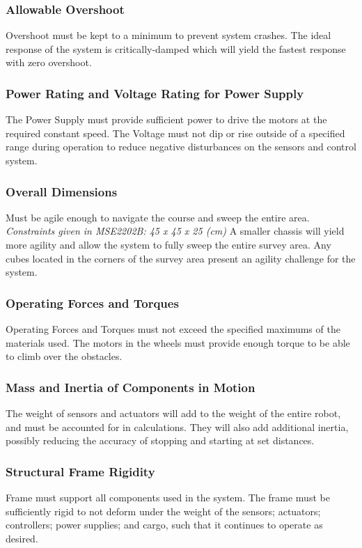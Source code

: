 \documentclass[12pt]{article}
\begin{document}
\subsubsection{Allowable Overshoot}
Overshoot must be kept to a minimum to prevent system crashes. The ideal response of the system is critically-damped which will yield the fastest response with zero overshoot.
\subsubsection{Power Rating and Voltage Rating for Power Supply}
The Power Supply must provide sufficient power to drive the motors at the required constant speed. The Voltage must not dip or rise outside of a specified range during operation to reduce negative disturbances on the sensors and control system.
\subsubsection{Overall Dimensions}
Must be agile enough to navigate the course and sweep the entire area. \textit{Constraints given in MSE2202B: 45 x 45 x 25 (cm)} A smaller chassis will yield more agility and allow the system to fully sweep the entire survey area. Any cubes located in the corners of the survey area present an agility challenge for the system.
\subsubsection{Operating Forces and Torques}
Operating Forces and Torques must not exceed the specified maximums of the materials used. The motors in the wheels must provide enough torque to be able to climb over the obstacles.
\subsubsection{Mass and Inertia of Components in Motion}
The weight of sensors and actuators will add to the weight of the entire robot, and must be accounted for in calculations. They will also add additional inertia, possibly reducing the accuracy of stopping and starting at set distances.
\subsubsection{Structural Frame Rigidity}
Frame must support all components used in the system. The frame must be sufficiently rigid to not deform under the weight of the sensors; actuators; controllers; power supplies; and cargo, such that it continues to operate as desired.
\end{document}
